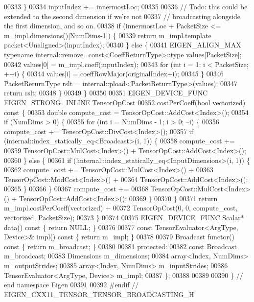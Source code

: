\begin{DoxyCode}
00333     \}
00334     inputIndex += innermostLoc;
00335 
00336     \textcolor{comment}{// Todo: this could be extended to the second dimension if we're not}
00337     \textcolor{comment}{// broadcasting alongside the first dimension, and so on.}
00338     \textcolor{keywordflow}{if} (innermostLoc + PacketSize <= m\_impl.dimensions()[NumDims-1]) \{
00339       \textcolor{keywordflow}{return} m\_impl.template packet<Unaligned>(inputIndex);
00340     \} \textcolor{keywordflow}{else} \{
00341       EIGEN\_ALIGN\_MAX \textcolor{keyword}{typename} internal::remove\_const<CoeffReturnType>::type values[PacketSize];
00342       values[0] = m\_impl.coeff(inputIndex);
00343       \textcolor{keywordflow}{for} (\textcolor{keywordtype}{int} i = 1; i < PacketSize; ++i) \{
00344         values[i] = coeffRowMajor(originalIndex+i);
00345       \}
00346       PacketReturnType rslt = internal::pload<PacketReturnType>(values);
00347       \textcolor{keywordflow}{return} rslt;
00348     \}
00349   \}
00350 
00351   EIGEN\_DEVICE\_FUNC EIGEN\_STRONG\_INLINE TensorOpCost
00352   costPerCoeff(\textcolor{keywordtype}{bool} vectorized)\textcolor{keyword}{ const }\{
00353     \textcolor{keywordtype}{double} compute\_cost = TensorOpCost::AddCost<Index>();
00354     \textcolor{keywordflow}{if} (NumDims > 0) \{
00355       \textcolor{keywordflow}{for} (\textcolor{keywordtype}{int} i = NumDims - 1; i > 0; --i) \{
00356         compute\_cost += TensorOpCost::DivCost<Index>();
00357         \textcolor{keywordflow}{if} (internal::index\_statically\_eq<Broadcast>(i, 1)) \{
00358           compute\_cost +=
00359               TensorOpCost::MulCost<Index>() + TensorOpCost::AddCost<Index>();
00360         \} \textcolor{keywordflow}{else} \{
00361           \textcolor{keywordflow}{if} (!internal::index\_statically\_eq<InputDimensions>(i, 1)) \{
00362             compute\_cost += TensorOpCost::MulCost<Index>() +
00363                             TensorOpCost::ModCost<Index>() +
00364                             TensorOpCost::AddCost<Index>();
00365           \}
00366         \}
00367         compute\_cost +=
00368             TensorOpCost::MulCost<Index>() + TensorOpCost::AddCost<Index>();
00369       \}
00370     \}
00371     \textcolor{keywordflow}{return} m\_impl.costPerCoeff(vectorized) +
00372            TensorOpCost(0, 0, compute\_cost, vectorized, PacketSize);
00373   \}
00374 
00375   EIGEN\_DEVICE\_FUNC Scalar* data()\textcolor{keyword}{ const }\{ \textcolor{keywordflow}{return} NULL; \}
00376 
00377   \textcolor{keyword}{const} TensorEvaluator<ArgType, Device>& impl()\textcolor{keyword}{ const }\{ \textcolor{keywordflow}{return} m\_impl; \}
00378 
00379   Broadcast functor()\textcolor{keyword}{ const }\{ \textcolor{keywordflow}{return} m\_broadcast; \}
00380 
00381  \textcolor{keyword}{protected}:
00382   \textcolor{keyword}{const} Broadcast m\_broadcast;
00383   Dimensions m\_dimensions;
00384   array<Index, NumDims> m\_outputStrides;
00385   array<Index, NumDims> m\_inputStrides;
00386   TensorEvaluator<ArgType, Device> m\_impl;
00387 \};
00388 
00389 
00390 \} \textcolor{comment}{// end namespace Eigen}
00391 
00392 \textcolor{preprocessor}{#endif // EIGEN\_CXX11\_TENSOR\_TENSOR\_BROADCASTING\_H}
\end{DoxyCode}
